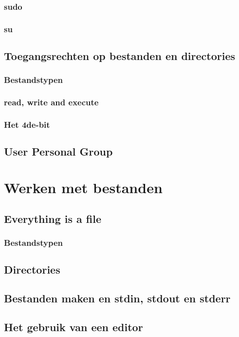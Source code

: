 \documentclass[a4paper,12pt,twoside,openright,titlepage]{book}
\begin{document}
\subsection{sudo}

\subsection{su}

\section{Toegangsrechten op bestanden en directories}
\subsection{Bestandstypen}
\subsection{read, write and execute}
\subsection{Het 4de-bit}
\section{User Personal Group}

\chapter{Werken met bestanden}
\section{Everything is a file}
\subsection{Bestandstypen}
\section{Directories}
\section{Bestanden maken en stdin, stdout en stderr}


\section{Het gebruik van een editor}

\end{document}
